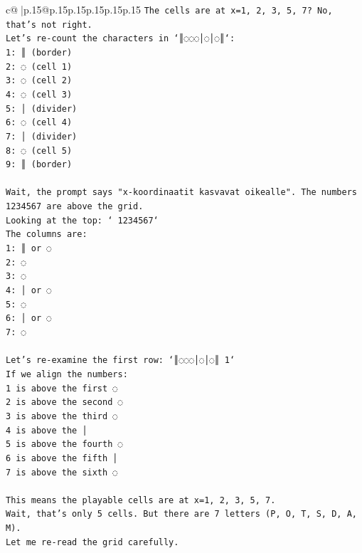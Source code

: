 \documentclass{article}
\begin{document}
{\begin{supertabular}{c@{$\;$}|p{.15\linewidth}@{}p{.15\linewidth}p{.15\linewidth}p{.15\linewidth}p{.15\linewidth}p{.15\linewidth}}
{{{\texttt{The cells are at x=1, 2, 3, 5, 7? No, that's not right.} \\
\texttt{Let's re{-}count the characters in `║◌◌◌│◌│◌║`:} \\
\texttt{1: ║ (border)} \\
\texttt{2: ◌ (cell 1)} \\
\texttt{3: ◌ (cell 2)} \\
\texttt{4: ◌ (cell 3)} \\
\texttt{5: │ (divider)} \\
\texttt{6: ◌ (cell 4)} \\
\texttt{7: │ (divider)} \\
\texttt{8: ◌ (cell 5)} \\
\texttt{9: ║ (border)} \\
\\ 
\texttt{Wait, the prompt says "x{-}koordinaatit kasvavat oikealle". The numbers 1234567 are above the grid.} \\
\texttt{Looking at the top: ` 1234567`} \\
\texttt{The columns are:} \\
\texttt{1: ║ or ◌} \\
\texttt{2: ◌} \\
\texttt{3: ◌} \\
\texttt{4: │ or ◌} \\
\texttt{5: ◌} \\
\texttt{6: │ or ◌} \\
\texttt{7: ◌} \\
\\ 
\texttt{Let's re{-}examine the first row: `║◌◌◌│◌│◌║ 1`} \\
\texttt{If we align the numbers:} \\
\texttt{1 is above the first ◌} \\
\texttt{2 is above the second ◌} \\
\texttt{3 is above the third ◌} \\
\texttt{4 is above the │} \\
\texttt{5 is above the fourth ◌} \\
\texttt{6 is above the fifth │} \\
\texttt{7 is above the sixth ◌} \\
\\ 
\texttt{This means the playable cells are at x=1, 2, 3, 5, 7.} \\
\texttt{Wait, that's only 5 cells. But there are 7 letters (P, O, T, S, D, A, M).} \\
\texttt{Let me re{-}read the grid carefully.} \\
}}}
\end{supertabular}}
\end{document}
